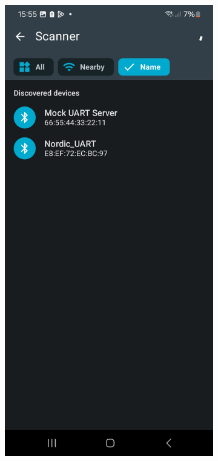 \begin{figure}[ht!]
\centering
\begin{subfigure}{.4\linewidth}
	\includegraphics[trim={0 4cm 0 3cm},clip, width=\linewidth]{graphics/nRF_toolbox_connect.jpg}

\end{subfigure}
\end{figure}
